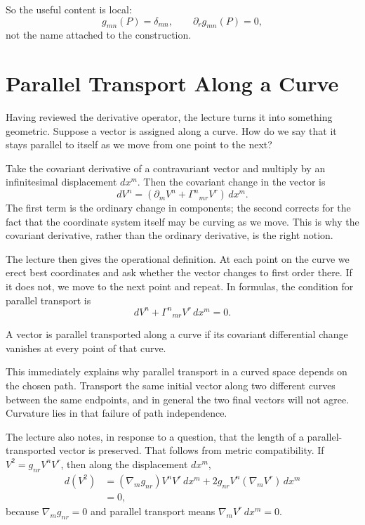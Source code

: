 So the useful content is local:
\begin{equation}
g_{mn}(P)=\delta_{mn},
\qquad
\partial_r g_{mn}(P)=0,
\end{equation}
not the name attached to the construction.

\section{Parallel Transport Along a Curve}

Having reviewed the derivative operator, the lecture turns it into something geometric. Suppose a vector is assigned along a curve. How do we say that it stays parallel to itself as we move from one point to the next?

Take the covariant derivative of a contravariant vector and multiply by an infinitesimal displacement \(dx^m\). Then the covariant change in the vector is
\begin{equation}
dV^n
=
\left(
\partial_m V^n+\Gamma^{n}{}_{mr}V^r
\right)\,dx^m.
\end{equation}
The first term is the ordinary change in components; the second corrects for the fact that the coordinate system itself may be curving as we move. This is why the covariant derivative, rather than the ordinary derivative, is the right notion.

The lecture then gives the operational definition. At each point on the curve we erect best coordinates and ask whether the vector changes to first order there. If it does not, we move to the next point and repeat. In formulas, the condition for parallel transport is
\begin{equation}
dV^n+\Gamma^{n}{}_{mr}V^r\,dx^m=0.
\end{equation}

\begin{definition}
A vector is parallel transported along a curve if its covariant differential change vanishes at every point of that curve.
\end{definition}

This immediately explains why parallel transport in a curved space depends on the chosen path. Transport the same initial vector along two different curves between the same endpoints, and in general the two final vectors will not agree. Curvature lies in that failure of path independence.

The lecture also notes, in response to a question, that the length of a parallel-transported vector is preserved. That follows from metric compatibility. If \(V^2=g_{nr}V^nV^r\), then along the displacement \(dx^m\),
\begin{align}
d(V^2)
&=
(\nabla_m g_{nr})V^nV^r\,dx^m
+
2g_{nr}V^n(\nabla_m V^r)\,dx^m \\
&=0,
\end{align}
because \(\nabla_m g_{nr}=0\) and parallel transport means \(\nabla_m V^r\,dx^m=0\).

